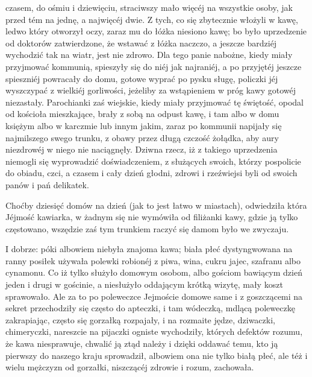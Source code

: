 \documentclass{book}
\begin{document}
czasem, do ośmiu i dziewięciu, straciwszy mało więcéj na wszystkie osoby, jak przed tém na jednę, a najwięcéj dwie. Z tych, co się zbytecznie włożyli w kawę, ledwo który otworzył oczy, zaraz mu do łóżka niesiono kawę; bo było uprzedzenie od doktorów zatwierdzone, że wstawać z łóżka naczczo, a jeszcze bardziéj wychodzić tak na wiatr, jest nie zdrowo. Dla tego panie nabożne, kiedy miały przyjmować kommunią, spieszyły się do niéj jak najraniéj, a po przyjętéj jeszcze spieszniéj powracały do domu, gotowe wyprać po pysku sługę, policzki jéj wyszczypać z wielkiéj gorliwości, jeżeliby za wstąpieniem w próg kawy gotowéj niezastały. Parochianki zaś wiejskie, kiedy miały przyjmować tę świętość, opodal od kościoła mieszkające, brały z sobą na odpust kawę, i tam albo w domu księżym albo w karczmie lub innym jakim, zaraz po kommunii napijały się najmilszego swego trunku, z obawy przez długą czczość żołądka, aby aury niezdrowéj w niego nie naciągnęły. Dziwna rzecz, iż z takiego uprzedzenia niemogli się wyprowadzić doświadczeniem, z służących swoich, którzy pospolicie do obiadu, czci, a czasem i cały dzień głodni, zdrowi i rzeźwiejsi byli od swoich panów i pań delikatek.

Choćby dziesięć domów na dzień (jak to jest łatwo w miastach), odwiedziła która Jéjmość kawiarka, w żadnym się nie wymówiła od filiżanki kawy, gdzie ją tylko częstowano, wszędzie zaś tym trunkiem raczyć się damom było we zwyczaju.

I dobrze: póki albowiem niebyła znajoma kawa; biała płeć dystyngwowana na ranny posiłek używała polewki robionéj z piwa, wina, cukru jajec, szafranu albo cynamonu. Co iż tylko służyło domowym osobom, albo gościom bawiącym dzień jeden i drugi w gościnie, a niesłużyło oddającym krótką wizytę, mały koszt sprawowało. Ale za to po poleweczce Jejmoście domowe same i z goszczącemi na sekret przechodziły się często do apteczki, i tam wódeczką, mdlącą poleweczkę zakrapiając, często się gorzałką rozpajały, i na rozmaite jędze, dziwaczki, chimeryczki, nareszcie na pijaczki ogniste wychodziły, których defektów rozumu, że kawa niesprawuje, chwalić ją ztąd należy i dzięki oddawać temu, kto ją pierwszy do naszego kraju sprowadził, albowiem ona nie tylko białą płeć, ale téż i wielu mężczyzn od gorzałki, niszczącéj zdrowie i rozum, zachowała.
\end{document}
